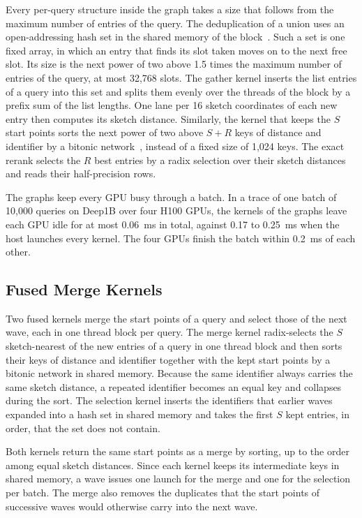 \documentclass[letterpaper,twocolumn,10pt]{article}
\begin{document}
Every per-query structure inside the graph takes a size that follows from the maximum number of entries of the query. The deduplication of a union uses an open-addressing hash set in the shared memory of the block~\cite{ashkiani2018hashtable}. Such a set is one fixed array, in which an entry that finds its slot taken moves on to the next free slot. Its size is the next power of two above 1.5 times the maximum number of entries of the query, at most 32,768 slots. The gather kernel inserts the list entries of a query into this set and splits them evenly over the threads of the block by a prefix sum of the list lengths. One lane per 16 sketch coordinates of each new entry then computes its sketch distance. Similarly, the kernel that keeps the $S$ start points sorts the next power of two above $S + R$ keys of distance and identifier by a bitonic network~\cite{batcher1968sorting}, instead of a fixed size of 1,024 keys. The exact rerank selects the $R$ best entries by a radix selection over their sketch distances and reads their half-precision rows.

The graphs keep every GPU busy through a batch. In a trace of one batch of 10,000 queries on Deep1B over four H100 GPUs, the kernels of the graphs leave each GPU idle for at most 0.06~ms in total, against 0.17 to 0.25~ms when the host launches every kernel. The four GPUs finish the batch within 0.2~ms of each other.

\subsection{Fused Merge Kernels}
\label{sec:fused}

Two fused kernels merge the start points of a query and select those of the next wave, each in one thread block per query. The merge kernel radix-selects the $S$ sketch-nearest of the new entries of a query in one thread block and then sorts their keys of distance and identifier together with the kept start points by a bitonic network in shared memory. Because the same identifier always carries the same sketch distance, a repeated identifier becomes an equal key and collapses during the sort. The selection kernel inserts the identifiers that earlier waves expanded into a hash set in shared memory and takes the first $S$ kept entries, in order, that the set does not contain.

Both kernels return the same start points as a merge by sorting, up to the order among equal sketch distances. Since each kernel keeps its intermediate keys in shared memory, a wave issues one launch for the merge and one for the selection per batch. The merge also removes the duplicates that the start points of successive waves would otherwise carry into the next wave.
\end{document}
